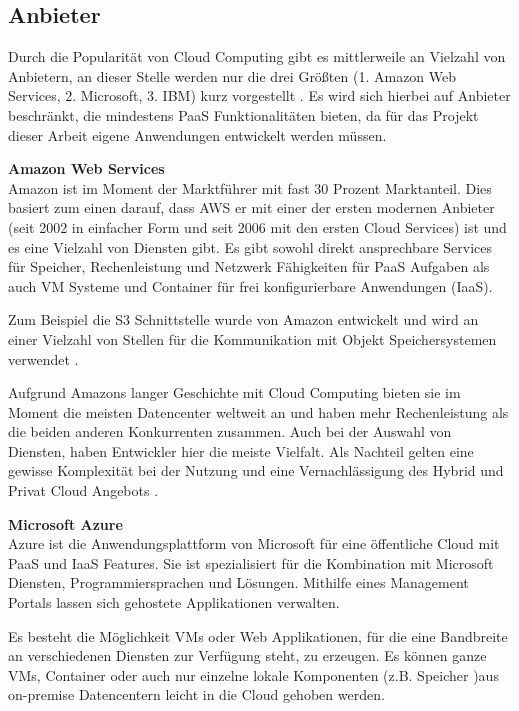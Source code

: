 \subsection{Anbieter}
Durch die Popularität von Cloud Computing gibt es mittlerweile an Vielzahl von Anbietern, an dieser Stelle werden nur die drei Größten (1. Amazon Web Services, 2. Microsoft, 3. IBM) kurz vorgestellt \parencite{statistia.2016}. Es wird sich hierbei auf Anbieter beschränkt, die mindestens \acs{PaaS} Funktionalitäten bieten, da für das Projekt dieser Arbeit eigene Anwendungen entwickelt werden müssen.


\textbf{Amazon Web Services}\\
Amazon ist im Moment der Marktführer mit fast 30 Prozent Marktanteil. Dies basiert zum einen darauf, dass \ac{AWS} er mit einer der ersten modernen Anbieter (seit 2002 in einfacher Form und seit 2006 mit den ersten Cloud Services) ist und es eine Vielzahl von Diensten gibt. Es gibt sowohl direkt ansprechbare Services für Speicher, Rechenleistung und Netzwerk Fähigkeiten für \acs{PaaS} Aufgaben als auch VM Systeme und Container für frei konfigurierbare Anwendungen (\acs{IaaS}).

Zum Beispiel die \ac{S3} Schnittstelle wurde von Amazon entwickelt und wird an einer Vielzahl von Stellen für die Kommunikation mit Objekt Speichersystemen verwendet \parencite{aws.2017}.

Aufgrund Amazons langer Geschichte mit Cloud Computing bieten sie im Moment die meisten Datencenter weltweit an und haben mehr Rechenleistung als die beiden anderen Konkurrenten zusammen. Auch bei der Auswahl von Diensten, haben Entwickler hier die meiste Vielfalt. Als Nachteil gelten eine gewisse Komplexität bei der Nutzung und eine Vernachlässigung des Hybrid und Privat Cloud Angebots \parencite{computerworlduk.2016}.


\textbf{Microsoft Azure}\\
Azure ist die Anwendungsplattform von Microsoft für eine öffentliche Cloud mit \acs{PaaS} und \acs{IaaS} Features. Sie ist spezialisiert für die Kombination mit Microsoft Diensten, Programmiersprachen und Lösungen. Mithilfe eines Management Portals lassen sich gehostete Applikationen verwalten. 

Es besteht die Möglichkeit \ac{VM}s oder Web Applikationen, für die eine Bandbreite an verschiedenen Diensten zur Verfügung steht, zu erzeugen. Es können ganze \acs{VM}s, Container oder auch nur einzelne lokale Komponenten (z.B. Speicher )aus on-premise Datencentern leicht in die Cloud gehoben werden.

